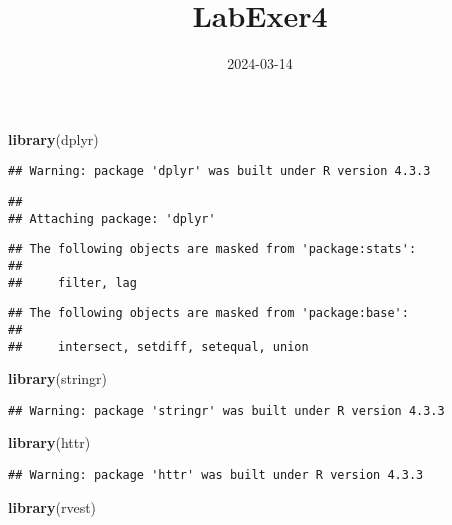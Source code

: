 \documentclass[
]{article}
\title{LabExer4}
\author{}
\date{\vspace{-2.5em}2024-03-14}
\newenvironment{Shaded}{\begin{snugshade}}{\end{snugshade}}
\newcommand{\FunctionTok}[1]{\textcolor[rgb]{0.13,0.29,0.53}{\textbf{#1}}}
\newcommand{\NormalTok}[1]{#1}
\begin{document}
\maketitle

\begin{Shaded}
\begin{Highlighting}[]
\FunctionTok{library}\NormalTok{(dplyr)}
\end{Highlighting}
\end{Shaded}

\begin{verbatim}
## Warning: package 'dplyr' was built under R version 4.3.3
\end{verbatim}

\begin{verbatim}
## 
## Attaching package: 'dplyr'
\end{verbatim}

\begin{verbatim}
## The following objects are masked from 'package:stats':
## 
##     filter, lag
\end{verbatim}

\begin{verbatim}
## The following objects are masked from 'package:base':
## 
##     intersect, setdiff, setequal, union
\end{verbatim}

\begin{Shaded}
\begin{Highlighting}[]
\FunctionTok{library}\NormalTok{(stringr)}
\end{Highlighting}
\end{Shaded}

\begin{verbatim}
## Warning: package 'stringr' was built under R version 4.3.3
\end{verbatim}

\begin{Shaded}
\begin{Highlighting}[]
\FunctionTok{library}\NormalTok{(httr)}
\end{Highlighting}
\end{Shaded}

\begin{verbatim}
## Warning: package 'httr' was built under R version 4.3.3
\end{verbatim}

\begin{Shaded}
\begin{Highlighting}[]
\FunctionTok{library}\NormalTok{(rvest)}
\end{Highlighting}
\end{Shaded}
\end{document}
